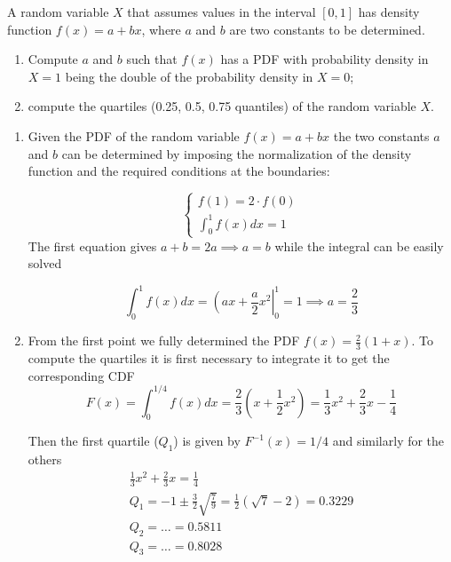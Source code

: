 \begin{question}
A random variable $X$ that assumes values in the interval $[0, 1]$ has density function $f(x) = a + b x$,
where $a$ and $b$ are two constants to be determined.

\begin{enumerate}[label={\emph{\alph*})}]
\tightlist
\item Compute $a$ and $b$ such that $f(x)$ has a PDF with probability density in $X = 1$ being the double of the probability density in $X = 0$;
\item compute the quartiles (0.25, 0.5, 0.75 quantiles) of the random variable $X$.
\end{enumerate}
\end{question}

\begin{solution}
\begin{enumerate}[label={\emph{\alph*})}]
\tightlist
\item Given the PDF of the random variable $f(x) = a + bx$ the two constants $a$ and $b$ can be determined by imposing the normalization of the density function and the required conditions at the boundaries:

\begin{equation*}
\begin{cases}
f(1) = 2\cdot f(0)\\
\int_0^1 f(x)dx = 1
\end{cases}  
\end{equation*}
The first equation gives $a+b = 2a \implies a = b$ while the integral can be easily solved

\begin{equation*}
\int_0^1 f(x)dx = \left(ax + \frac{a}{2}x^2\right|^1_0 = 1 \implies a = \frac{2}{3}
\end{equation*}

\item From the first point we fully determined the PDF $f(x) = \frac{2}{3}(1 + x)$. To compute the quartiles it is first necessary to integrate it to get the corresponding CDF 
\begin{equation*}
F(x) = \int_0^{1/4} f(x)dx = \frac{2}{3}\left(x + \frac{1}{2}x^2\right) = \frac{1}{3}x^2 + \frac{2}{3} x  - \frac{1}{4}
\end{equation*}

Then the first quartile ($Q_1$) is given by $F^{-1}(x) = 1/4$ and similarly for the others
\begin{gather*}
\frac{1}{3}x^2 + \frac{2}{3} x  = \frac{1}{4} \\
Q_1 = -1 \pm \frac{3}{2}\sqrt{\frac{7}{9}} = \frac{1}{2}(\sqrt{7} - 2) = 0.3229\\
Q_2 = \dots = 0.5811\\
Q_3 = \dots = 0.8028
\end{gather*}
\end{enumerate}
\end{solution}

